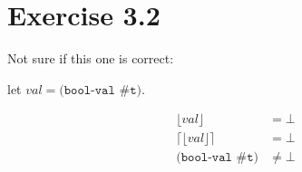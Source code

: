 \section{Exercise 3.2}

Not sure if this one is correct:

let $val = \texttt{(bool-val \#t)}$.

\begin{align*}
    \lfloor val \rfloor & = \bot \\
    \lceil \lfloor val \rfloor \rceil  & = \bot \\
    \texttt{(bool-val \#t)} & \neq \bot
\end{align*}
